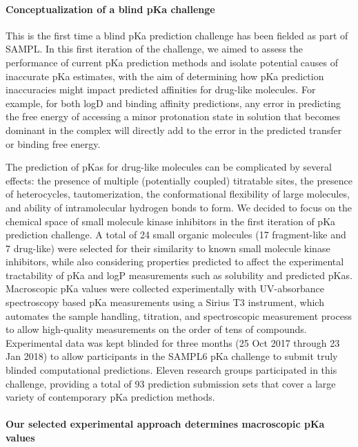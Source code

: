 \documentclass[9pt,lineno]{elife}
\begin{document}
\paragraph{Conceptualization of a blind pKa challenge}

This is the first time a blind pKa prediction challenge has been fielded as part of SAMPL. 
In this first iteration of the challenge, we aimed to assess the performance of current pKa prediction methods and isolate potential causes of inaccurate pKa estimates, with the aim of determining how pKa prediction inaccuracies might impact predicted affinities for drug-like molecules. 
For example, for both logD and binding affinity predictions, any error in predicting the free energy of accessing a minor protonation state in solution that becomes dominant in the complex will directly add to the error in the predicted transfer or binding free energy. 

The prediction of pKas for drug-like molecules can be complicated by several effects: the presence of multiple (potentially coupled) titratable sites, the presence of heterocycles, tautomerization, the conformational flexibility of large molecules, and ability of intramolecular hydrogen bonds to form. 
We decided to focus on the chemical space of small molecule kinase inhibitors in the first iteration of pKa prediction challenge. 
A total of 24 small organic molecules (17 fragment-like and 7 drug-like) were selected for their similarity to known small molecule kinase inhibitors, while also considering properties predicted to affect the experimental tractability of pKa and logP measurements such as solubility and predicted pKas. 
Macroscopic pKa values were collected experimentally with UV-absorbance spectroscopy based pKa measurements using a Sirius T3 instrument, which automates the sample handling, titration, and spectroscopic measurement process to allow high-quality measurements on the order of tens of compounds. 
Experimental data was kept blinded for three months (25 Oct 2017 through 23 Jan 2018) to allow participants in the SAMPL6 pKa challenge to submit truly blinded computational predictions. 
Eleven research groups participated in this challenge, providing a total of 93 prediction submission sets that cover a large variety of contemporary pKa prediction methods. 
 
\paragraph{Our selected experimental approach determines macroscopic pKa values}
\end{document}
